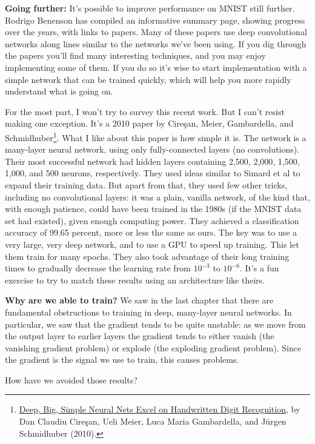 \documentclass[a4paper,twoside,10pt]{book}
\begin{document}
\textbf{Going further:} It's possible to improve performance on MNIST still further. Rodrigo Benenson has compiled an informative summary page, showing progress over the years, with links to papers. Many of these papers use deep convolutional networks along lines similar to the networks we've been using. If you dig through the papers you'll find many interesting techniques, and you may enjoy implementing some of them. If you do so it's wise to start implementation with a simple network that can be trained quickly, which will help you more rapidly understand what is going on.

For the most part, I won't try to survey this recent work. But I can't resist making one exception. It's a 2010 paper by Cire\c{s}an, Meier, Gambardella, and Schmidhuber\footnote{\href{http://arxiv.org/abs/1003.0358}{Deep, Big, Simple Neural Nets Excel on Handwritten Digit Recognition}, by Dan Claudiu Cire\c{s}an, Ueli Meier, Luca Maria Gambardella, and J\"urgen Schmidhuber (2010).}. What I like about this paper is how simple it is. The network is a many-layer neural network, using only fully-connected layers (no convolutions). Their most successful network had hidden layers containing 2,500, 2,000, 1,500, 1,000, and 500 neurons, respectively. They used ideas similar to Simard et al to expand their training data. But apart from that, they used few other tricks, including no convolutional layers: it was a plain, vanilla network, of the kind that, with enough patience, could have been trained in the 1980s (if the MNIST data set had existed), given enough computing power. They achieved a classification accuracy of 99.65 percent, more or less the same as ours. The key was to use a very large, very deep network, and to use a GPU to speed up training. This let them train for many epochs. They also took advantage of their long training times to gradually decrease the learning rate from $10^{-3}$ to $10^{-6}$. It's a fun exercise to try to match these results using an architecture like theirs.

\textbf{Why are we able to train?} We saw in the last chapter that there are fundamental obstructions to training in deep, many-layer neural networks. In particular, we saw that the gradient tends to be quite unstable: as we move from the output layer to earlier layers the gradient tends to either vanish (the vanishing gradient problem) or explode (the exploding gradient problem). Since the gradient is the signal we use to train, this causes problems.

How have we avoided those results?
\end{document}
